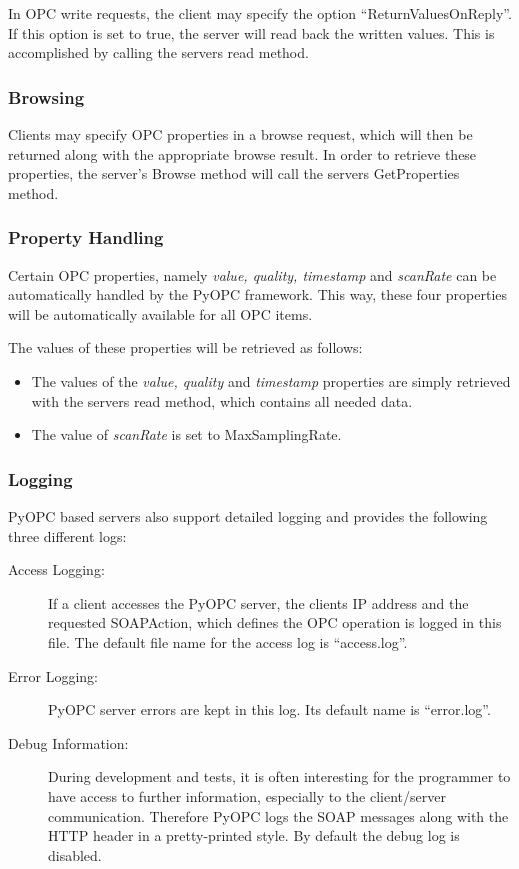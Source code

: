 In OPC write requests, the client may specify the option
``ReturnValuesOnReply''. If this option is set to true, the server
will read back the written values. This is accomplished by
calling the servers read method.

\subsubsection*{Browsing}

Clients may specify OPC properties in a browse request, which will
then be returned along with the appropriate browse result. In order to
retrieve these properties, the server's Browse method will call the
servers GetProperties method.

\subsubsection*{Property Handling}

Certain OPC properties, namely {\sl value, quality, timestamp} and
{\sl scanRate} can be automatically handled by the PyOPC
framework. This way, these four properties will be automatically
available for all OPC items.

The values of these properties will be retrieved as follows:

\begin{itemize}
\item The values of the {\sl value, quality} and {\sl timestamp} 
properties are simply retrieved with the servers read method,
which contains all needed data.
\item The value of {\sl scanRate} is set to MaxSamplingRate.
\end{itemize}

\subsubsection*{Logging}

PyOPC based servers also support detailed logging and provides the
following three different logs:

\begin{description}
\item[Access Logging:] If a client accesses the PyOPC server, the
clients IP address and the requested SOAPAction, which defines
the OPC operation is logged in this file. The default file name
for the access log is ``access.log''.
\item[Error Logging:] PyOPC server errors are kept in this log.
Its default name is ``error.log''.
\item[Debug Information:] During development and tests, it is often
interesting for the programmer to have access to further information,
especially to the client/server communication. Therefore PyOPC logs
the SOAP messages along with the HTTP header in a pretty-printed
style. By default the debug log is disabled.
\end{description}

